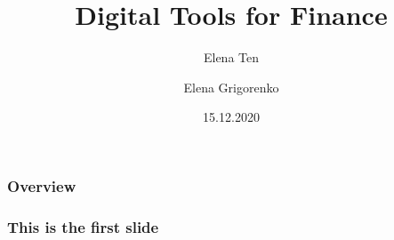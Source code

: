 \documentclass {beamer}
\title{Digital Tools for Finance}
\author{Elena Ten \and Elena Grigorenko}
\institute{University of Zurich}
\date {15.12.2020}
\begin{document}
\frame{\titlepage}

\begin{frame}
\frametitle{Overview}
\tableofcontents

\end{frame}


\begin{frame}
\frametitle{This is the first slide}

\end{frame}
\end{document}
